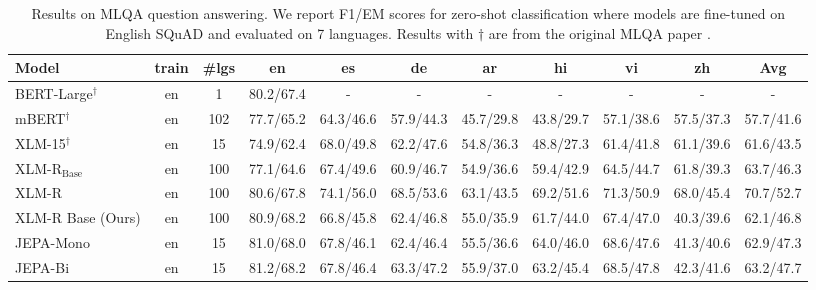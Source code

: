 \begin{table}[t]
\centering
\small
\begin{tabular}{lcccccccccc}
\toprule
\textbf{Model} & \textbf{train} & \textbf{\#lgs} & \textbf{en} & \textbf{es} & \textbf{de} & \textbf{ar} & \textbf{hi} & \textbf{vi} & \textbf{zh} & \textbf{Avg} \\
\midrule
BERT-Large$^\dagger$ & en & 1 & 80.2/67.4 & - & - & - & - & - & - & - \\
mBERT$^\dagger$ & en & 102 & 77.7/65.2 & 64.3/46.6 & 57.9/44.3 & 45.7/29.8 & 43.8/29.7 & 57.1/38.6 & 57.5/37.3 & 57.7/41.6 \\
XLM-15$^\dagger$ & en & 15 & 74.9/62.4 & 68.0/49.8 & 62.2/47.6 & 54.8/36.3 & 48.8/27.3 & 61.4/41.8 & 61.1/39.6 & 61.6/43.5 \\
XLM-R$_{\text{Base}}$ & en & 100 & 77.1/64.6 & 67.4/49.6 & 60.9/46.7 & 54.9/36.6 & 59.4/42.9 & 64.5/44.7 & 61.8/39.3 & 63.7/46.3 \\
XLM-R & en & 100 & 80.6/67.8 & 74.1/56.0 & 68.5/53.6 & 63.1/43.5 & 69.2/51.6 & 71.3/50.9 & 68.0/45.4 & 70.7/52.7 \\
\midrule
XLM-R Base (Ours) & en & 100 & 80.9/68.2 & 66.8/45.8 & 62.4/46.8 & 55.0/35.9 & 61.7/44.0 & 67.4/47.0 & 40.3/39.6 & 62.1/46.8 \\
JEPA-Mono & en & 15 & 81.0/68.0 & 67.8/46.1 & 62.4/46.4 & 55.5/36.6 & 64.0/46.0 & 68.6/47.6 & 41.3/40.6 & 62.9/47.3 \\
JEPA-Bi & en & 15 & 81.2/68.2 & 67.8/46.4 & 63.3/47.2 & 55.9/37.0 & 63.2/45.4 & 68.5/47.8 & 42.3/41.6 & 63.2/47.7 \\
\bottomrule
\end{tabular}
\caption{Results on MLQA question answering. We report F1/EM scores for zero-shot classification where models are fine-tuned on English SQuAD and evaluated on 7 languages. Results with $\dagger$ are from the original MLQA paper \citep{lewis2019mlqa}.}
\label{tab:mlqa_results}
\end{table}